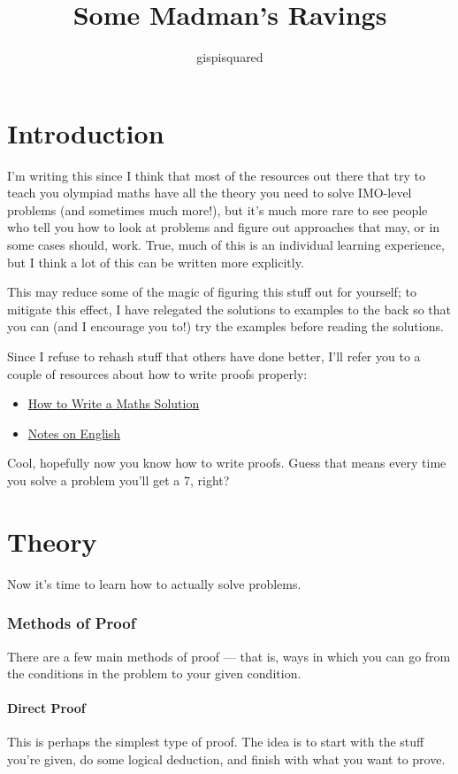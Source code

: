 \documentclass{amsart}
\title{Some Madman's Ravings}
\author{gispisquared}
\begin{document}
\maketitle
\tableofcontents
\newpage
\part{Introduction}
I'm writing this since I think that most of the resources out there that try to
teach you olympiad maths have all the theory you need to solve IMO-level
problems (and sometimes much more!), but it's much more rare to see people who
tell you how to look at problems and figure out approaches that may, or in some
cases should, work. True, much of this is an individual learning experience, but
I think a lot of this can be written more explicitly.

This may reduce some of the magic of figuring this stuff out for yourself; to
mitigate this effect, I have relegated the solutions to examples to the back so
that you can (and I encourage you to!) try the examples before reading the
solutions.

Since I refuse to rehash stuff that others have done better, I'll refer you to a
couple of resources about how to write proofs properly:
\begin{itemize}
  \item
    \href{https://artofproblemsolving.com/news/articles/how-to-write-a-solution}
    {How to Write a Maths Solution}
  \item \href{https://web.evanchen.cc/handouts/english/english.pdf}{Notes on
    English}
\end{itemize}

Cool, hopefully now you know how to write proofs. Guess that means every time
you solve a problem you'll get a 7, right?
\newpage
\part{Theory}
Now it's time to learn how to actually solve problems.
\section{Methods of Proof}
There are a few main methods of proof --- that is, ways in which you can go from
the conditions in the problem to your given condition.

\subsection{Direct Proof}
This is perhaps the simplest type of proof. The idea is to start with the stuff
you're given, do some logical deduction, and finish with what you want to prove.
\end{document}
